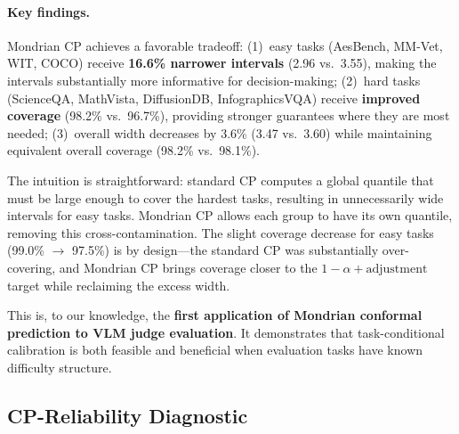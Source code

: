 \documentclass{article}
\begin{document}
\paragraph{Key findings.} Mondrian CP achieves a favorable tradeoff: (1)~easy tasks (AesBench, MM-Vet, WIT, COCO) receive \textbf{16.6\% narrower intervals} (2.96 vs.\ 3.55), making the intervals substantially more informative for decision-making; (2)~hard tasks (ScienceQA, MathVista, DiffusionDB, InfographicsVQA) receive \textbf{improved coverage} (98.2\% vs.\ 96.7\%), providing stronger guarantees where they are most needed; (3)~overall width decreases by 3.6\% (3.47 vs.\ 3.60) while maintaining equivalent overall coverage (98.2\% vs.\ 98.1\%).

The intuition is straightforward: standard CP computes a global quantile that must be large enough to cover the hardest tasks, resulting in unnecessarily wide intervals for easy tasks. Mondrian CP allows each group to have its own quantile, removing this cross-contamination. The slight coverage decrease for easy tasks (99.0\% $\to$ 97.5\%) is by design---the standard CP was substantially over-covering, and Mondrian CP brings coverage closer to the $1 - \alpha + \text{adjustment}$ target while reclaiming the excess width.

This is, to our knowledge, the \textbf{first application of Mondrian conformal prediction to VLM judge evaluation}. It demonstrates that task-conditional calibration is both feasible and beneficial when evaluation tasks have known difficulty structure.

\subsection{CP-Reliability Diagnostic}
\label{sec:rsg_results}
\end{document}
